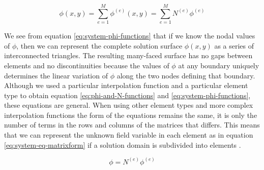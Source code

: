 \begin{equation}
\label{eq:system-phi-functions}
\phi(x,y) = \sum_{e=1}^M \phi^{(e)}(x,y) = \sum_{e=1}^M N^{(e)} \phi^{(e)} 
\end{equation}

We see from equation \eqref{eq:system-phi-functions} that if we know
the nodal values of $\phi$, then we can represent the complete
solution surface $\phi(x,y)$ as a series of interconnected triangles.
The resulting many-faced surface has no gaps between elements and no
discontinuities because the values of $\phi$ at any boundary uniquely
determines the linear variation of $\phi$ along the two nodes defining
that boundary.
%
Although we used a particular interpolation function and a particular
element type
to obtain equation \eqref{eq:phi-and-N-functions} and
\eqref{eq:system-phi-functions}, these equations are general.
%
When using other element types and more complex interpolation
functions the form of the equations remains the same, it is only the
number of terms in the rows and columns of the matrices that differs.
This means that we can represent the unknown field variable in each element
as in equation \eqref{eq:system-eq-matrixform} if a solution domain is
subdivided into elements .

\begin{equation}
\label{eq:system-eq-matrixform}
\phi = N^{(e)} \phi^{(e)}
\end{equation}


